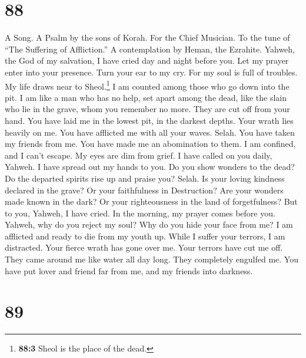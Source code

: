 \hypertarget{section-80}{%
\section{88}\label{section-80}}

A Song. A Psalm by the sons of Korah. For the Chief Musician. To the
tune of ``The Suffering of Affliction.'' A contemplation by Heman, the
Ezrahite.  Yahweh, the God of my salvation, I have cried
day and night before you.  Let my prayer enter into your
presence. Turn your ear to my cry.  For my soul is full of
troubles. My life draws near to Sheol.\footnote{\textbf{88:3} Sheol is
  the place of the dead.}  I am counted among those who go
down into the pit. I am like a man who has no help,  set
apart among the dead, like the slain who lie in the grave, whom you
remember no more. They are cut off from your hand.  You
have laid me in the lowest pit, in the darkest depths. 
Your wrath lies heavily on me. You have afflicted me with all your
waves. Selah.  You have taken my friends from me. You have
made me an abomination to them. I am confined, and I can't escape.
 My eyes are dim from grief. I have called on you daily,
Yahweh. I have spread out my hands to you.  Do you show
wonders to the dead? Do the departed spirits rise up and praise you?
Selah.  Is your loving kindness declared in the grave? Or
your faithfulness in Destruction?  Are your wonders made
known in the dark? Or your righteousness in the land of forgetfulness?
 But to you, Yahweh, I have cried. In the morning, my
prayer comes before you.  Yahweh, why do you reject my
soul? Why do you hide your face from me?  I am afflicted
and ready to die from my youth up. While I suffer your terrors, I am
distracted.  Your fierce wrath has gone over me. Your
terrors have cut me off.  They came around me like water
all day long. They completely engulfed me.  You have put
lover and friend far from me, and my friends into darkness.

\hypertarget{section-81}{%
\section{89}\label{section-81}}

